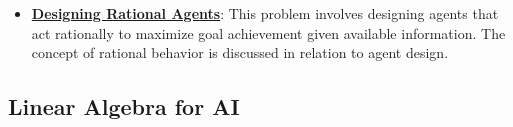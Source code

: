 \documentclass{article}%
\begin{document}
\begin{itemize}[leftmargin=*]
\item \href{https://purdue.brightspace.com/d2l/common/assets/pdfjs-d2l-dist/1.0.14-legacy/web/viewer.html?file=%2Fcontent%2Fenforced%2F1095467-wl.202510.CS.24300.001%2F14L1-DepthFS.pdf%3Fou%3D1095467&lang=en-us&container=d2l-fileviewer-rendered-pdf&fullscreen=d2l-fileviewer-rendered-pdf-dialog&height=667#page=39}{\textbf{Designing Rational Agents}}: This problem involves designing agents that act rationally to maximize goal achievement given available information. The concept of rational behavior is discussed in relation to agent design.%
\end{itemize}

%
\subsection{Linear Algebra for AI}%
\label{subsec:LinearAlgebraforAI}%
\end{document}
